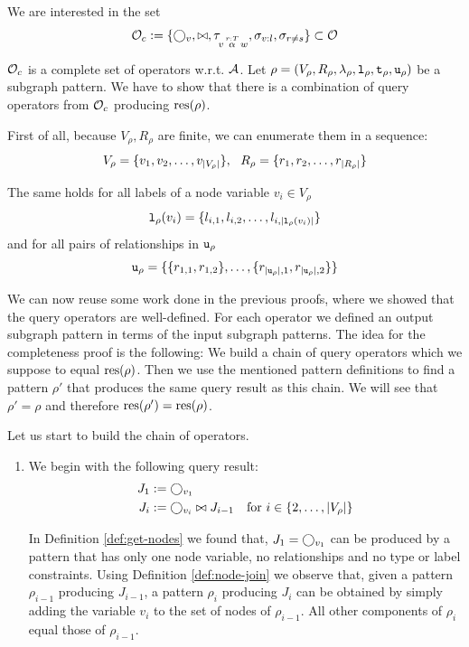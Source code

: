 We are interested in the set
\[
  \mathcal{O}_c := \{ \bigcirc_{v}, \bowtie, \tau\!_{v\, \overset{r:T}{\alpha} \, w},
                     \sigma_{v:l}, \sigma_{r \not = s} \} \subset \mathcal{O}
\]

\begin{proofof}{$\mathcal{O}_c$ is a complete set of operators w.r.t.
                $\mathcal{A}$.}
  Let $\rho = (V_\rho, R_\rho, \lambda_\rho, \texttt{l}_\rho, \texttt{t}_\rho, \texttt{u}_\rho)$ be a
  subgraph pattern. We have to show that there is a combination of query
  operators from $\mathcal{O}_c$ producing $\text{res}(\rho)$.
  
  First of all, because $V_\rho, R_\rho$ are finite, we can enumerate them in
  a sequence:
  \[
    V_\rho = \{ v_1, v_2, \ldots, v_{\left \vert V_\rho \right \vert} \}, ~~ R_\rho = \{ r_1, r_2, \ldots, r_{\left \vert R_\rho \right \vert} \}
  \]
  
  The same holds for all labels of a node variable $v_i \in V_\rho$
  \[
    \texttt{l}_\rho(v_i) = \{ l_{i,1}, l_{i,2}, \ldots, l_{i,{\left \vert \texttt{l}_\rho(v_i) \right \vert}} \}
  \]
  and for all pairs of relationships in $\texttt{u}_\rho$
  \[
    \texttt{u}_\rho = \{ \{r_{1,1}, r_{1,2}\}, \ldots, \{r_{{\left \vert \texttt{u}_\rho \right \vert},1}, r_{{\left \vert \texttt{u}_\rho \right \vert},2}\} \}
  \]
  
  We can now reuse some work done in the previous proofs, where we showed that
  the query operators are well-defined.
  For each operator we defined an output subgraph pattern in terms of the
  input subgraph patterns. The idea for the completeness proof is the
  following:
  We build a chain of query operators which we suppose to equal
  $\text{res}(\rho)$. Then we use the mentioned pattern definitions to find a
  pattern $\rho'$ that produces the same query result as this chain.
  We will see that $\rho' = \rho$ and therefore
  $\text{res}(\rho') = \text{res}(\rho)$.
  
  Let us start to build the chain of operators.
  
  \begin{enumerate}
    \item %
      We begin with the following query result: 
      \begin{align*}
        J_1 &:= \bigcirc_{v_1} \\
        J_i &:= \bigcirc_{v_i} \bowtie J_{i-1}
          ~~\text{ for } i \in \{ 2, \ldots, {\left \vert V_\rho \right \vert} \}
      \end{align*}
      
      In Definition \ref{def:get-nodes} we found that,
      $J_1 = \bigcirc_{v_1}$ can be produced by a pattern that has only one node variable,
      no relationships and no type or label constraints.
      Using Definition \ref{def:node-join} we observe that, given a pattern $\rho_{i-1}$
      producing $J_{i-1}$, a pattern $\rho_i$ producing $J_i$ can be obtained by simply
      adding the variable $v_i$ to the set of nodes of $\rho_{i-1}$.
      All other components of $\rho_i$ equal those of $\rho_{i-1}$.
      

\end{enumerate}
\end{proofof}
